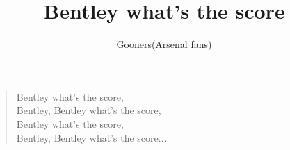 \documentclass[a4paper,12pt]{article}
\title{Bentley what's the score}
\author{Gooners(Arsenal fans)}
\date{}
\begin{document}
	
	\maketitle
	
	\begin{verse}
		
		Bentley what's the score, \\
		Bentley, Bentley what's the score, \\
		Bentley what's the score, \\
		Bentley, Bentley what's the score$\ldots$
		
	\end{verse}
	
\end{document}
